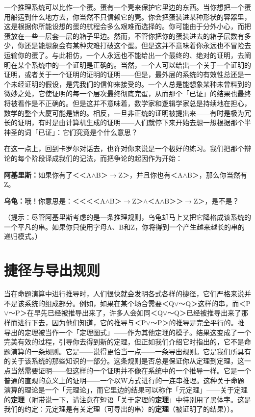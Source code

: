 \documentclass[
  12pt,
  twoside,
  openright,
  oldfontcommands,
]{memoir}
\newcommand{\heititext}[1]{{\heifamily\bfseries #1}}
\newcommand{\dialogname}[1]{{\heifamily\bfseries #1}}
\begin{document}
一个推理系统可以比作一个蛋。蛋有一个壳来保护它里边的东西。当你想把一个蛋用船运到什么地方去，你当然不只信赖它的壳。你会把蛋装进某种形状的容器里，这是根据你所能设想的蛋的航程会多么艰难而选择的。你可能由于分外小心，而把蛋放在一些一层套一层的箱子里边。然而，不管你把你的蛋装进去的箱子层数有多少，你还是能想象会有某种灾难打破这个蛋。但是这并不意味着你永远也不冒险去运输你的蛋了。与此相仿，一个人永远也不能给出一个最终的、绝对的证明，去阐明在某个系统中的一个证明是正确的。当然，一个人可以给出一个关于一个证明的证明，或者关于一个证明的证明的证明------但是，最外层的系统的有效性总还是一个未经证明的假设，是凭我们的信仰来接受的。一个人总是能想象某种未曾料到的微妙之处，它使证明的每一个层次最终彻底完蛋，从而那个「已证」的结果也最终将被看作是不正确的。但是这并不意味着，数学家和逻辑学家总是持续地在担心，数学的整个大厦可能是错的。相反，一旦非正统的证明被提出来------有时是极为冗长的证明，有时是由计算机生成的证明------人们就停下来开始去想一想根据那个半神圣的词「已证」：它们究竟是个什么意思？

在这一点上，回到卡罗尔对话去，也许对你来说是一个极好的练习。我们把那个辩论的每个阶段译成我们的记法，而把争论的起因作为开始：

\dialogname{阿基里斯：}如果你有了＜＜A$\wedge$B＞$\rightarrow$Z＞，并且你也有＜A$\wedge$B＞，那么你当然有Z。

\dialogname{乌龟：}哦！你意思是：＜＜＜＜A$\wedge$B＞$\rightarrow$Z＞$\wedge$＜A$\wedge$B＞＞$\rightarrow$Z＞，是不是？

（提示：尽管阿基里斯考虑的是一条推理规则，乌龟却马上又把它降格成该系统的一个平凡的串。如果你只使用字母A、B和Z，你将得到一个产生越来越长的串的递归模式。）

\section{捷径与导出规则}

当在命题演算中进行推导时，人们很快就会发明各式各样的捷径，它们严格来说并不是该系统的组成部分。例如，如果在某个场合需要＜Q$\vee$～Q＞这样的串，而＜P$\vee$～P＞在早先已经被推导出来了，许多人会如同＜Q$\vee$～Q＞已经被推导出来了那样而进行下去，因为他们知道，它的推导与＜P$\vee$～P＞的推导是完全平行的。推导出的定理被当作一个「定理图式」------作为其他定理的模子。结果这变成了一个完美有效的过程，引导你去得到新的定理，但正如我们介绍它时指出的，它不是命题演算的一条规则。它是------说得更恰当一点------一条导出规则。它是我们所具有的关于该系统的那些知识的一部分。这条规则是否总是保证你从定理到定理，这一点当然需要证明------但这样的一个证明并不像在系统中的一个推导一样。它是一个普通的直观的意义上的证明------一个以W方式进行的一连串推理。这种关于命题演算的理论是一个「元理论」，而它里边的结果可以称作「元定理」------关于定理的\heititext{定理}（附带说一下，请注意在短语「关于定理的\heititext{定理}」中特别用了黑体字。这是我们的约定：元定理是有关定理（可导出的串）的\heititext{定理}（被证明了的结果））。
\end{document}
